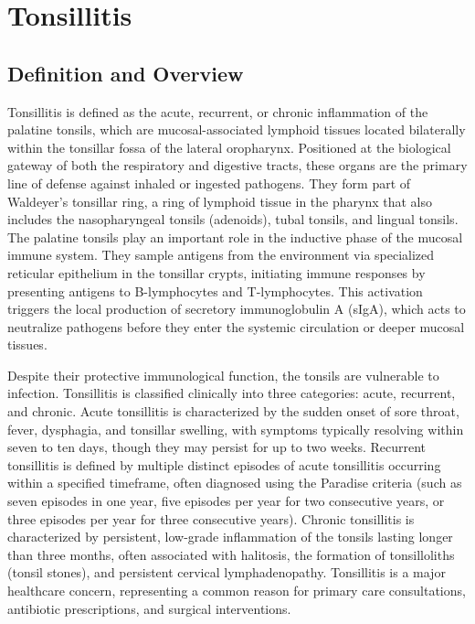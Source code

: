 \chapter{Tonsillitis}

\section*{Definition and Overview}
Tonsillitis is defined as the acute, recurrent, or chronic inflammation of the palatine tonsils, which are mucosal-associated lymphoid tissues located bilaterally within the tonsillar fossa of the lateral oropharynx. Positioned at the biological gateway of both the respiratory and digestive tracts, these organs are the primary line of defense against inhaled or ingested pathogens. They form part of Waldeyer's tonsillar ring, a ring of lymphoid tissue in the pharynx that also includes the nasopharyngeal tonsils (adenoids), tubal tonsils, and lingual tonsils. The palatine tonsils play an important role in the inductive phase of the mucosal immune system. They sample antigens from the environment via specialized reticular epithelium in the tonsillar crypts, initiating immune responses by presenting antigens to B-lymphocytes and T-lymphocytes. This activation triggers the local production of secretory immunoglobulin A (sIgA), which acts to neutralize pathogens before they enter the systemic circulation or deeper mucosal tissues.

Despite their protective immunological function, the tonsils are vulnerable to infection. Tonsillitis is classified clinically into three categories: acute, recurrent, and chronic. Acute tonsillitis is characterized by the sudden onset of sore throat, fever, dysphagia, and tonsillar swelling, with symptoms typically resolving within seven to ten days, though they may persist for up to two weeks. Recurrent tonsillitis is defined by multiple distinct episodes of acute tonsillitis occurring within a specified timeframe, often diagnosed using the Paradise criteria (such as seven episodes in one year, five episodes per year for two consecutive years, or three episodes per year for three consecutive years). Chronic tonsillitis is characterized by persistent, low-grade inflammation of the tonsils lasting longer than three months, often associated with halitosis, the formation of tonsilloliths (tonsil stones), and persistent cervical lymphadenopathy. Tonsillitis is a major healthcare concern, representing a common reason for primary care consultations, antibiotic prescriptions, and surgical interventions.

